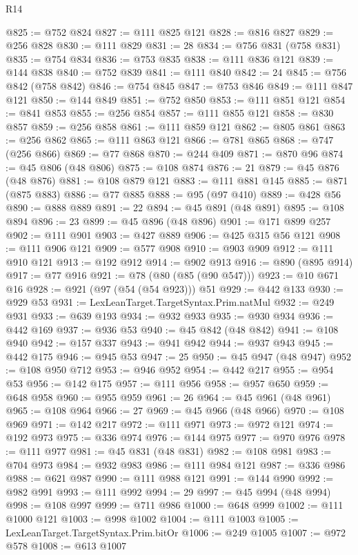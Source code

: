 \begin{lexlean}{R14}
\begin{coremodule}
@825 := @752 @824
@827 := @111 @825 @121
@828 := @816 @827
@829 := @256 @828
@830 := @111 @829
@831 := 28
@834 := @756 @831 (@758 @831)
@835 := @754 @834
@836 := @753 @835
@838 := @111 @836 @121
@839 := @144 @838
@840 := @752 @839
@841 := @111 @840
@842 := 24
@845 := @756 @842 (@758 @842)
@846 := @754 @845
@847 := @753 @846
@849 := @111 @847 @121
@850 := @144 @849
@851 := @752 @850
@853 := @111 @851 @121
@854 := @841 @853
@855 := @256 @854
@857 := @111 @855 @121
@858 := @830 @857
@859 := @256 @858
@861 := @111 @859 @121
@862 := @805 @861
@863 := @256 @862
@865 := @111 @863 @121
@866 := @781 @865
@868 := @747 (@256 @866)
@869 := @77 @868
@870 := @244 @409
@871 := @870 @96
@874 := @45 @806 (@48 @806)
@875 := @108 @874
@876 := 21
@879 := @45 @876 (@48 @876)
@881 := @108 @879 @121
@883 := @111 @881 @145
@885 := @871 (@875 @883)
@886 := @77 @885
@888 := @95 (@97 @410)
@889 := @428 @56
@890 := @888 @889
@891 := 22
@894 := @45 @891 (@48 @891)
@895 := @108 @894
@896 := 23
@899 := @45 @896 (@48 @896)
@901 := @171 @899 @257
@902 := @111 @901
@903 := @427 @889
@906 := @425 @315 @56 @121
@908 := @111 @906 @121
@909 := @577 @908
@910 := @903 @909
@912 := @111 @910 @121
@913 := @192 @912
@914 := @902 @913
@916 := @890 (@895 @914)
@917 := @77 @916
@921 := @78 (@80 (@85 (@90 @547)))
@923 := @10 @671 @16
@928 := @921 (@97 (@54 (@54 @923))) @51
@929 := @442 @133
@930 := @929 @53
@931 := LexLeanTarget.TargetSyntax.Prim.natMul
@932 := @249 @931
@933 := @639 @193
@934 := @932 @933
@935 := @930 @934
@936 := @442 @169
@937 := @936 @53
@940 := @45 @842 (@48 @842)
@941 := @108 @940
@942 := @157 @337
@943 := @941 @942
@944 := @937 @943
@945 := @442 @175
@946 := @945 @53
@947 := 25
@950 := @45 @947 (@48 @947)
@952 := @108 @950 @712
@953 := @946 @952
@954 := @442 @217
@955 := @954 @53
@956 := @142 @175
@957 := @111 @956
@958 := @957 @650
@959 := @648 @958
@960 := @955 @959
@961 := 26
@964 := @45 @961 (@48 @961)
@965 := @108 @964
@966 := 27
@969 := @45 @966 (@48 @966)
@970 := @108 @969
@971 := @142 @217
@972 := @111 @971
@973 := @972 @121
@974 := @192 @973
@975 := @336 @974
@976 := @144 @975
@977 := @970 @976
@978 := @111 @977
@981 := @45 @831 (@48 @831)
@982 := @108 @981
@983 := @704 @973
@984 := @932 @983
@986 := @111 @984 @121
@987 := @336 @986
@988 := @621 @987
@990 := @111 @988 @121
@991 := @144 @990
@992 := @982 @991
@993 := @111 @992
@994 := 29
@997 := @45 @994 (@48 @994)
@998 := @108 @997
@999 := @711 @986
@1000 := @648 @999
@1002 := @111 @1000 @121
@1003 := @998 @1002
@1004 := @111 @1003
@1005 := LexLeanTarget.TargetSyntax.Prim.bitOr
@1006 := @249 @1005
@1007 := @972 @578
@1008 := @613 @1007

\end{coremodule}
\end{lexlean}
